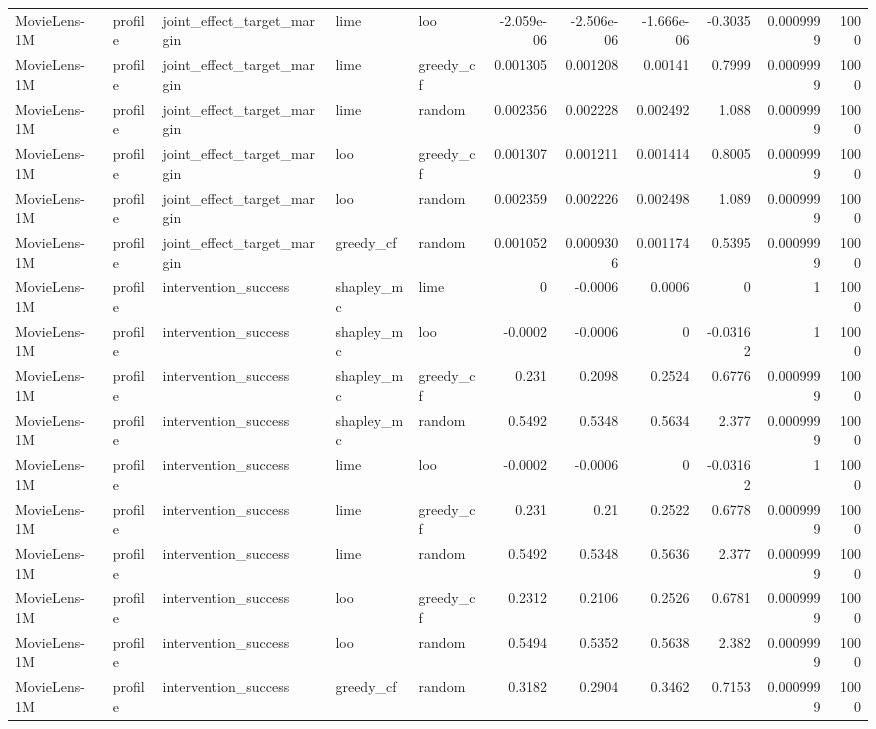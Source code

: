 \begin{table}[t]
\begin{tabular}{lllllrrrrrr}
MovieLens-1M & profile & joint\_effect\_target\_margin & lime & loo & -2.059e-06 & -2.506e-06 & -1.666e-06 & -0.3035 & 0.0009999 & 1000 \\
MovieLens-1M & profile & joint\_effect\_target\_margin & lime & greedy\_cf & 0.001305 & 0.001208 & 0.00141 & 0.7999 & 0.0009999 & 1000 \\
MovieLens-1M & profile & joint\_effect\_target\_margin & lime & random & 0.002356 & 0.002228 & 0.002492 & 1.088 & 0.0009999 & 1000 \\
MovieLens-1M & profile & joint\_effect\_target\_margin & loo & greedy\_cf & 0.001307 & 0.001211 & 0.001414 & 0.8005 & 0.0009999 & 1000 \\
MovieLens-1M & profile & joint\_effect\_target\_margin & loo & random & 0.002359 & 0.002226 & 0.002498 & 1.089 & 0.0009999 & 1000 \\
MovieLens-1M & profile & joint\_effect\_target\_margin & greedy\_cf & random & 0.001052 & 0.0009306 & 0.001174 & 0.5395 & 0.0009999 & 1000 \\
MovieLens-1M & profile & intervention\_success & shapley\_mc & lime & 0 & -0.0006 & 0.0006 & 0 & 1 & 1000 \\
MovieLens-1M & profile & intervention\_success & shapley\_mc & loo & -0.0002 & -0.0006 & 0 & -0.03162 & 1 & 1000 \\
MovieLens-1M & profile & intervention\_success & shapley\_mc & greedy\_cf & 0.231 & 0.2098 & 0.2524 & 0.6776 & 0.0009999 & 1000 \\
MovieLens-1M & profile & intervention\_success & shapley\_mc & random & 0.5492 & 0.5348 & 0.5634 & 2.377 & 0.0009999 & 1000 \\
MovieLens-1M & profile & intervention\_success & lime & loo & -0.0002 & -0.0006 & 0 & -0.03162 & 1 & 1000 \\
MovieLens-1M & profile & intervention\_success & lime & greedy\_cf & 0.231 & 0.21 & 0.2522 & 0.6778 & 0.0009999 & 1000 \\
MovieLens-1M & profile & intervention\_success & lime & random & 0.5492 & 0.5348 & 0.5636 & 2.377 & 0.0009999 & 1000 \\
MovieLens-1M & profile & intervention\_success & loo & greedy\_cf & 0.2312 & 0.2106 & 0.2526 & 0.6781 & 0.0009999 & 1000 \\
MovieLens-1M & profile & intervention\_success & loo & random & 0.5494 & 0.5352 & 0.5638 & 2.382 & 0.0009999 & 1000 \\
MovieLens-1M & profile & intervention\_success & greedy\_cf & random & 0.3182 & 0.2904 & 0.3462 & 0.7153 & 0.0009999 & 1000 \\

\end{tabular}
\end{table}
